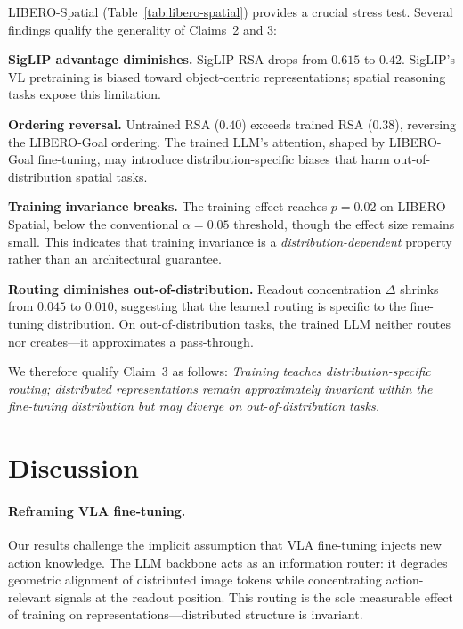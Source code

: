 \documentclass[letterpaper]{article}
\begin{document}
LIBERO-Spatial (Table~\ref{tab:libero-spatial}) provides a crucial stress test. Several findings qualify the generality of Claims~2 and 3:

\textbf{SigLIP advantage diminishes.} SigLIP RSA drops from $0.615$ to $0.42$. SigLIP's VL pretraining is biased toward object-centric representations; spatial reasoning tasks expose this limitation.

\textbf{Ordering reversal.} Untrained RSA ($0.40$) exceeds trained RSA ($0.38$), reversing the LIBERO-Goal ordering. The trained LLM's attention, shaped by LIBERO-Goal fine-tuning, may introduce distribution-specific biases that harm out-of-distribution spatial tasks.

\textbf{Training invariance breaks.} The training effect reaches $p{=}0.02$ on LIBERO-Spatial, below the conventional $\alpha{=}0.05$ threshold, though the effect size remains small. This indicates that training invariance is a \emph{distribution-dependent} property rather than an architectural guarantee.

\textbf{Routing diminishes out-of-distribution.} Readout concentration $\Delta$ shrinks from $0.045$ to $0.010$, suggesting that the learned routing is specific to the fine-tuning distribution. On out-of-distribution tasks, the trained LLM neither routes nor creates---it approximates a pass-through.

We therefore qualify Claim~3 as follows: \emph{Training teaches distribution-specific routing; distributed representations remain approximately invariant within the fine-tuning distribution but may diverge on out-of-distribution tasks.}

\section{Discussion}
\label{sec:discussion}

\paragraph{Reframing VLA fine-tuning.}
Our results challenge the implicit assumption that VLA fine-tuning injects new action knowledge. The LLM backbone acts as an information router: it degrades geometric alignment of distributed image tokens while concentrating action-relevant signals at the readout position. This routing is the sole measurable effect of training on representations---distributed structure is invariant.
\end{document}
